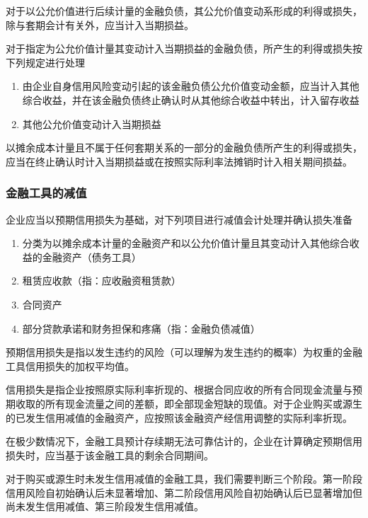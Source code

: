 \documentclass[UTF8,12pt]{ctexart}
\numberwithin{equation}{section} %
\numberwithin{figure}{section}
\numberwithin{table}{section}
\begin{document}
	对于以公允价值进行后续计量的金融负债，其公允价值变动系形成的利得或损失，除与套期会计有关外，应当计入当期损益。
	
	对于指定为公允价值计量其变动计入当期损益的金融负债，所产生的利得或损失按下列规定进行处理
	\begin{enumerate}
		\item 由企业自身信用风险变动引起的该金融负债公允价值变动金额，应当计入其他综合收益，并在该金融负债终止确认时从其他综合收益中转出，计入留存收益
		
		\item 其他公允价值变动计入当期损益
	\end{enumerate}

	以摊余成本计量且不属于任何套期关系的一部分的金融负债所产生的利得或损失，应当在终止确认时计入当期损益或在按照实际利率法摊销时计入相关期间损益。
	
	
	
	
	\subsubsection{金融工具的减值}
	企业应当以预期信用损失为基础，对下列项目进行减值会计处理并确认损失准备
	\begin{enumerate}
		\item 分类为以摊余成本计量的金融资产和以公允价值计量且其变动计入其他综合收益的金融资产（债务工具）
		
		\item 租赁应收款（指：应收融资租赁款）
		
		\item 合同资产
		
		\item 部分贷款承诺和财务担保和疼痛（指：金融负债减值）
	\end{enumerate}
	
	预期信用损失是指以发生违约的风险（可以理解为发生违约的概率）为权重的金融工具信用损失的加权平均值。
	
	信用损失是指企业按照原实际利率折现的、根据合同应收的所有合同现金流量与预期收取的所有现金流量之间的差额，即全部现金短缺的现值。对于企业购买或源生的已发生信用减值的金融资产，应按照该金融资产经信用调整的实际利率折现。
	
	在极少数情况下，金融工具预计存续期无法可靠估计的，企业在计算确定预期信用损失时，应当基于该金融工具的剩余合同期间。
	
	对于购买或源生时未发生信用减值的金融工具，我们需要判断三个阶段。第一阶段信用风险自初始确认后未显著增加、第二阶段信用风险自初始确认后已显著增加但尚未发生信用减值、第三阶段发生信用减值。
	
\end{document}
